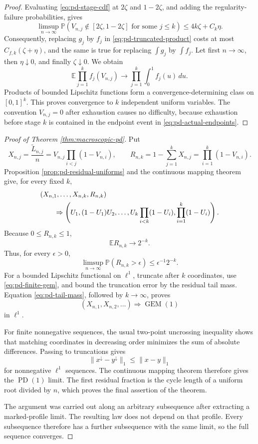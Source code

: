 \documentclass[11pt]{article}
\theoremstyle{remark}
\newcommand{\Pp}{\mathbb P}
\newcommand{\Ee}{\mathbb E}
\newcommand{\dd}{\,d}
\begin{document}
\begin{proof}
Evaluating \eqref{eq:pd-stage-cdf} at $2\zeta$ and $1-2\zeta$, and adding the
regularity-failure probabilities, gives
\begin{equation}
 \limsup_{n\to\infty}\Pp\left(
 V_{n,j}\notin[2\zeta,1-2\zeta]
 \text{ for some }j\le k\right)
 \le4k\zeta+C_k\eta.
 \label{eq:pd-actual-endpoints}
\end{equation}
Consequently, replacing $g_j$ by $f_j$ in
\eqref{eq:pd-truncated-product} costs at most
$C_{f,k}(\zeta+\eta)$, and the same is true for replacing
$\int g_j$ by $\int f_j$.  Let first $n\to\infty$, then
$\eta\downarrow0$, and finally $\zeta\downarrow0$.  We obtain
\[
        \Ee\prod_{j=1}^kf_j(V_{n,j})
        \longrightarrow
        \prod_{j=1}^k\int_0^1f_j(u)\dd u.
\]
Products of bounded Lipschitz functions form a convergence-determining class on
$[0,1]^k$.  This proves convergence to $k$ independent uniform variables.
The convention $V_{n,j}=0$ after exhaustion causes no difficulty, because
exhaustion before stage $k$ is contained in the endpoint event in
\eqref{eq:pd-actual-endpoints}.
\end{proof}

\begin{proof}[Proof of Theorem \ref{thm:macroscopic-pd}]
Put
\[
 X_{n,j}=\frac{\widetilde L_{n,j}}n
 =V_{n,j}\prod_{i<j}(1-V_{n,i}),
 \qquad
 R_{n,k}=1-\sum_{j=1}^kX_{n,j}
        =\prod_{i=1}^k(1-V_{n,i}).
\]
Proposition \ref{prop:pd-residual-uniforms} and the continuous mapping theorem
give, for every fixed $k$,
\begin{align}
 &(X_{n,1},\ldots,X_{n,k},R_{n,k})\notag\\
 &\qquad\Rightarrow
 \left(U_1,(1-U_1)U_2,\ldots,
 U_k\prod_{i<k}(1-U_i),\prod_{i=1}^k(1-U_i)\right).
 \label{eq:pd-finite-gem}
\end{align}
Because $0\le R_{n,k}\le1$,
\[
        \Ee R_{n,k}\longrightarrow2^{-k}.\]
Thus, for every $\epsilon>0$,
\[
 \limsup_{n\to\infty}\Pp(R_{n,k}>\epsilon)
 \le\epsilon^{-1}2^{-k}.
 \label{eq:pd-tail-mass}
\]
For a bounded Lipschitz functional on $\ell^1$, truncate after $k$ coordinates,
use \eqref{eq:pd-finite-gem}, and bound the truncation error by the residual
tail mass.  Equation \eqref{eq:pd-tail-mass}, followed by $k\to\infty$, proves
\[
        (X_{n,1},X_{n,2},\ldots)
        \Rightarrow\operatorname{GEM}(1)
\]
in $\ell^1$.

For finite nonnegative sequences, the usual two-point uncrossing inequality
shows that matching coordinates in decreasing order minimizes the sum of
absolute differences.  Passing to truncations gives
\[
        \|x^\downarrow-y^\downarrow\|_1\le\|x-y\|_1
\]
for nonnegative $\ell^1$ sequences.  The continuous mapping theorem therefore
gives the $\operatorname{PD}(1)$ limit.  The first residual fraction is the
cycle length of a uniform root divided by $n$, which proves the final assertion
of the theorem.

The argument was carried out along an arbitrary subsequence after extracting a
marked-profile limit.  The resulting law does not depend on that profile.
Every subsequence therefore has a further subsequence with the same limit, so
the full sequence converges.
\end{proof}
\end{document}
